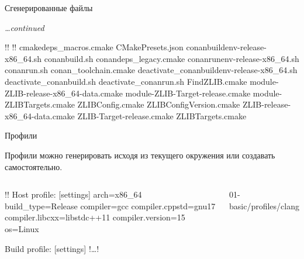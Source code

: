 \documentclass[compress, 8pt, aspectratio=169]{beamer}
\begin{document}
\begin{frame}[fragile]{Сгенерированные файлы}

  \textit{\dots continued}\bigbreak

  {\small
  \begin{terminalwindow}[!!][minted options={escapeinside=!!, firstline=15}]
!!
!!
cmakedeps_macros.cmake
CMakePresets.json
conanbuildenv-release-x86_64.sh
conanbuild.sh
conandeps_legacy.cmake
conanrunenv-release-x86_64.sh
conanrun.sh
conan_toolchain.cmake
deactivate_conanbuildenv-release-x86_64.sh
deactivate_conanbuild.sh
deactivate_conanrun.sh
FindZLIB.cmake
module-ZLIB-release-x86_64-data.cmake
module-ZLIB-Target-release.cmake
module-ZLIBTargets.cmake
ZLIBConfig.cmake
ZLIBConfigVersion.cmake
ZLIB-release-x86_64-data.cmake
ZLIB-Target-release.cmake
ZLIBTargets.cmake
  \end{terminalwindow}
  }

\end{frame}

\begin{frame}[fragile]{Профили}

  Профили можно генерировать исходя из текущего окружения или создавать
  самостоятельно.

  \begin{columns}[T]


    \begin{terminalwindow}
!!
Host profile:
[settings]
arch=x86_64
build_type=Release
compiler=gcc
compiler.cppstd=gnu17
compiler.libcxx=libstdc++11
compiler.version=15
os=Linux

Build profile:
[settings]
!\dots!
    \end{terminalwindow}


      {01-basic/profiles/clang}

  \end{columns}

  \bigbreak

\end{frame}
\end{document}

